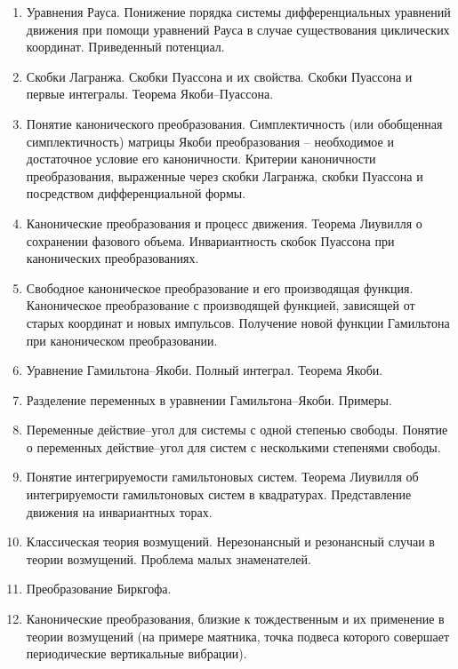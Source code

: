 \begin{enumerate}
\item Уравнения Рауса. Понижение порядка системы дифференциальных уравнений движения при помощи уравнений Рауса в случае существования циклических координат. Приведенный потенциал.

\item Скобки Лагранжа. Скобки Пуассона и их свойства. Скобки Пуассона и первые интегралы. Теорема Якоби–Пуассона.

\item Понятие канонического преобразования. Симплектичность (или обобщенная симплектичность) матрицы Якоби преобразования – необходимое и достаточное условие его каноничности. Критерии каноничности преобразования, выраженные через скобки Лагранжа, скобки Пуассона и посредством дифференциальной формы.

\item Канонические преобразования и процесс движения. Теорема Лиувилля о сохранении фазового объема. Инвариантность скобок Пуассона при канонических преобразованиях.

\item Свободное каноническое преобразование и его производящая функция. Каноническое преобразование с производящей функцией, зависящей от старых координат и новых импульсов. Получение новой функции Гамильтона при каноническом преобразовании.

\item Уравнение Гамильтона–Якоби. Полный интеграл. Теорема Якоби.

\item Разделение переменных в уравнении Гамильтона–Якоби. Примеры.

\item Переменные действие–угол для системы с одной степенью свободы. Понятие о переменных действие–угол для систем с несколькими степенями свободы.

\item Понятие интегрируемости гамильтоновых систем. Теорема Лиувилля об интегрируемости гамильтоновых систем в квадратурах. Представление движения на инвариантных торах.

\item Классическая теория возмущений. Нерезонансный и резонансный случаи в теории возмущений. Проблема малых знаменателей.

\item Преобразование Биркгофа.

\item Канонические преобразования, близкие к тождественным и их применение в теории возмущений (на примере маятника, точка подвеса которого совершает периодические вертикальные вибрации).


\end{enumerate}
